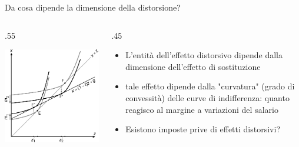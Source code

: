 \documentclass[aspectratio=64,11pt]{beamer}
\begin{document}
\begin{frame}{Da cosa dipende la dimensione della distorsione?}
\begin{columns}
\begin{column}{.55\columnwidth}
\begin{center}
\includegraphics[width=\textwidth]{./figure/effetto-distorsivo-imposte-ql-8.pdf}
\end{center}
\end{column}


\begin{column}{.45\columnwidth}
\begin{itemize}
\item L'entità dell'effetto distorsivo dipende dalla dimensione dell'effetto di sostituzione
\item tale effetto dipende dalla "curvatura" (grado di convessità) delle curve di indifferenza: quanto reagisco al margine a variazioni del salario
\item Esistono imposte prive di effetti distorsivi?
\end{itemize}
\end{column}
\end{columns}
\end{frame}
\end{document}
